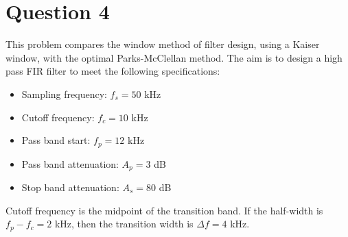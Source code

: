 \section*{Question 4}

This problem compares the window method of filter design, using a Kaiser window, with the optimal Parks-McClellan method. The aim is to design a high pass FIR filter to meet the following specifications:
\begin{multicols}{2}
    \begin{itemize}
        \item Sampling frequency: $f_s=50$ kHz
        \item Cutoff frequency: $f_c=10$ kHz
        \item Pass band start: $f_p=12$ kHz
        \item Pass band attenuation: $A_p=3$ dB
        \item Stop band attenuation: $A_s=80$ dB
    \end{itemize}
\end{multicols}
Cutoff frequency is the midpoint of the transition band. If the half-width is $f_p-f_c=2$ kHz, then the transition width is $\Delta f=4$ kHz.

